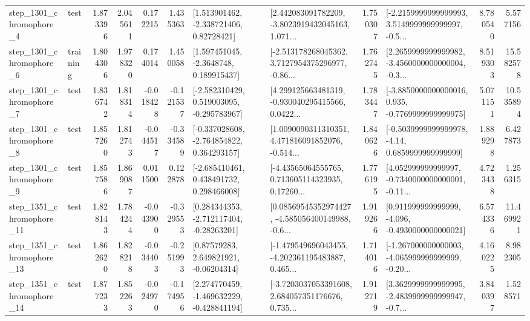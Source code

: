 \begin{tabular}{llrrrrllrlrr}
  step\_1301\_chromophore\_4 &      test &      1.873396 &    2.045611 &      0.172215 &  1.435363 &     [1.513901462, -2.338721406, 0.82728421] &  [2.442083091782209, -3.8023919432045163, 1.071... &       1.750307 &  [-2.2159999999999993, 3.5149999999999997, -0.5... &            8.780540 &          5.577156 \\
  step\_1301\_chromophore\_6 &  training &      1.804306 &    1.978320 &      0.174014 &  1.450058 &      [1.597451045, -2.3648748, 0.189915437] &  [-2.513178268045362, 3.7127954375296977, -0.86... &       1.762745 &  [2.2659999999999982, -3.4560000000000004, -0.3... &            8.519303 &         15.582578 \\
  step\_1301\_chromophore\_7 &      test &      1.836742 &    1.818314 &     -0.018428 & -0.121537 &   [-2.582310429, 0.519003095, -0.295783967] &  [4.299125663481319, -0.930040295415566, 0.0422... &       1.783447 &  [-3.8850000000000016, 0.935, -0.7769999999999975] &            5.071151 &         10.535894 \\
  step\_1301\_chromophore\_8 &      test &      1.857260 &    1.812743 &     -0.044517 & -0.334589 &   [-0.337028608, -2.764854822, 0.364293157] &  [1.0090090311310351, 4.471816091852076, -0.514... &       1.840626 &   [-0.5039999999999978, -4.14, 0.6859999999999999] &            1.889298 &          6.427873 \\
  step\_1301\_chromophore\_9 &      test &      1.857586 &    1.869087 &      0.011500 &  0.122878 &    [-2.685410461, 0.438491732, 0.298466008] &  [-4.43565064555765, 0.713605114323935, 0.17260... &       1.776195 &  [4.052999999999997, -0.7340000000000001, -0.11... &            4.723438 &          1.256315 \\
 step\_1351\_chromophore\_11 &      test &      1.828143 &    1.784244 &     -0.043900 & -0.329553 &    [0.284344353, -2.712117404, -0.28263201] &  [0.08569545352974427, -4.585056400149988, -0.6... &       1.919266 &   [0.911999999999999, -4.096, -0.4930000000000021] &            6.574336 &         11.469921 \\
 step\_1351\_chromophore\_13 &      test &      1.862620 &    1.828218 &     -0.034403 & -0.251993 &      [0.87579283, 2.649821921, -0.06204314] &  [-1.479549696043455, -4.202361195483887, 0.465... &       1.714016 &  [-1.267000000000003, -4.065999999999999, -0.20... &            4.160225 &          8.982305 \\
 step\_1351\_chromophore\_14 &      test &      1.877233 &    1.852263 &     -0.024970 & -0.174956 &   [2.274770459, -1.469632229, -0.428841194] &  [-3.7203037053391608, 2.684057351176676, 0.735... &       1.912719 &  [3.3629999999999995, -2.4839999999999947, -0.7... &            3.840397 &          1.528571 \\

\end{tabular}
